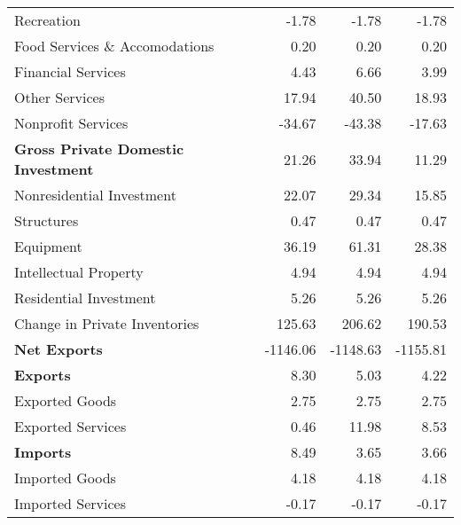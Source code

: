 \documentclass[11pt, letterpaper]{article}\usepackage[]{graphicx}\usepackage[]{color}
\begin{document}
\begin{table}[H]
\begin{tabular}{lrrr}
  \hspace{16mm}  Recreation & -1.78 & -1.78 & -1.78 \\ 
  \hspace{16mm}  Food Services \& Accomodations & 0.20 & 0.20 & 0.20 \\ 
  \hspace{16mm}  Financial Services & 4.43 & 6.66 & 3.99 \\ 
  \hspace{16mm}  Other Services & 17.94 & 40.50 & 18.93 \\ 
  \hspace{16mm}  Nonprofit Services & -34.67 & -43.38 & -17.63 \\ 
  \hspace{0mm} \textbf{Gross Private Domestic Investment} & 21.26 & 33.94 & 11.29 \\ 
  \hspace{8mm}  Nonresidential Investment & 22.07 & 29.34 & 15.85 \\ 
  \hspace{16mm}  Structures & 0.47 & 0.47 & 0.47 \\ 
  \hspace{16mm}  Equipment & 36.19 & 61.31 & 28.38 \\ 
  \hspace{16mm}  Intellectual Property & 4.94 & 4.94 & 4.94 \\ 
  \hspace{8mm}  Residential Investment & 5.26 & 5.26 & 5.26 \\ 
  \hspace{8mm}  Change in Private Inventories & 125.63 & 206.62 & 190.53 \\ 
  \hspace{0mm} \textbf{Net Exports} & -1146.06 & -1148.63 & -1155.81 \\ 
  \hspace{0mm} \textbf{Exports} & 8.30 & 5.03 & 4.22 \\ 
  \hspace{8mm}  Exported Goods & 2.75 & 2.75 & 2.75 \\ 
  \hspace{8mm}  Exported Services & 0.46 & 11.98 & 8.53 \\ 
  \hspace{0mm} \textbf{Imports} & 8.49 & 3.65 & 3.66 \\ 
  \hspace{8mm}  Imported Goods & 4.18 & 4.18 & 4.18 \\ 
  \hspace{8mm}  Imported Services & -0.17 & -0.17 & -0.17 \\ 

\end{tabular}
\end{table}
\end{document}
